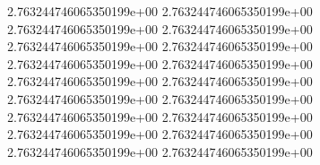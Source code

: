 	2.763244746065350199e+00	2.763244746065350199e+00	2.763244746065350199e+00	2.763244746065350199e+00	2.763244746065350199e+00	2.763244746065350199e+00	2.763244746065350199e+00	2.763244746065350199e+00	2.763244746065350199e+00	2.763244746065350199e+00	2.763244746065350199e+00	2.763244746065350199e+00	2.763244746065350199e+00	2.763244746065350199e+00	2.763244746065350199e+00	2.763244746065350199e+00	2.763244746065350199e+00	2.763244746065350199e+00
